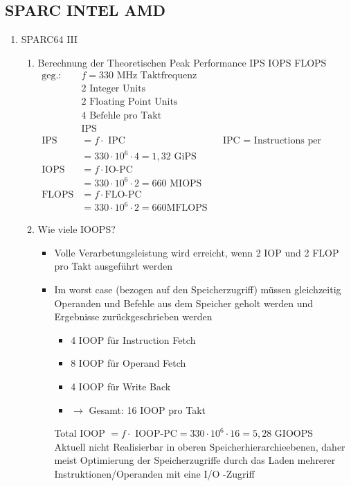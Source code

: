 \subsection{SPARC INTEL AMD}
\begin{enumerate}
	\item SPARC64 III 
	\begin{enumerate}
		\item Berechnung der Theoretischen Peak Performance IPS IOPS FLOPS
		\begin{align*}
			\text{geg.: } &f = 330  \text{ MHz Taktfrequenz} \\
			&2 \text{ Integer Units}\\
			&2 \text{ Floating Point Units}\\
			&4 \text{ Befehle pro Takt}\\
			&\text{IPS}\\
			\text{IPS} &= f \cdot \text{ IPC} &&\text{IPC = Instructions per Cycle(Clock)}\\
			&= 330 \cdot 10^6 \cdot 4 = 1,32 \text{ GiPS}\\
			\text{IOPS} &= f \cdot \text{IO-PC}\\
			&= 330 \cdot 10^6 \cdot 2 = 660 \text{ MIOPS}\\
			\text{FLOPS} &= f \cdot \text{FLO-PC}\\
			&= 330 \cdot 10^6 \cdot 2 = 660 \text{MFLOPS}
		\end{align*}
		\item Wie viele IOOPS?
		\begin{itemize}
			\item Volle Verarbetungsleistung wird erreicht, wenn 2 IOP und 2 FLOP pro Takt ausgeführt werden
			\item Im worst case (bezogen auf den Speicherzugriff) müssen gleichzeitig Operanden und Befehle aus dem Speicher geholt werden und Ergebnisse zurückgeschrieben werden
			\begin{itemize}
				\item 4 IOOP für Instruction Fetch
				\item 8 IOOP für Operand Fetch
				\item 4 IOOP für Write Back
				\item \(\to\) Gesamt: 16 IOOP pro Takt
			\end{itemize}
			Total IOOP \(= f \cdot \text{ IOOP-PC} = 330 \cdot 10^6 \cdot 16 = 5,28\) GIOOPS \\
			Aktuell nicht Realisierbar in oberen Speicherhierarchieebenen, daher meist Optimierung der Speicherzugriffe durch das Laden mehrerer Instruktionen/Operanden mit eine I/O -Zugriff

\end{itemize}
\end{enumerate}
\end{enumerate}
